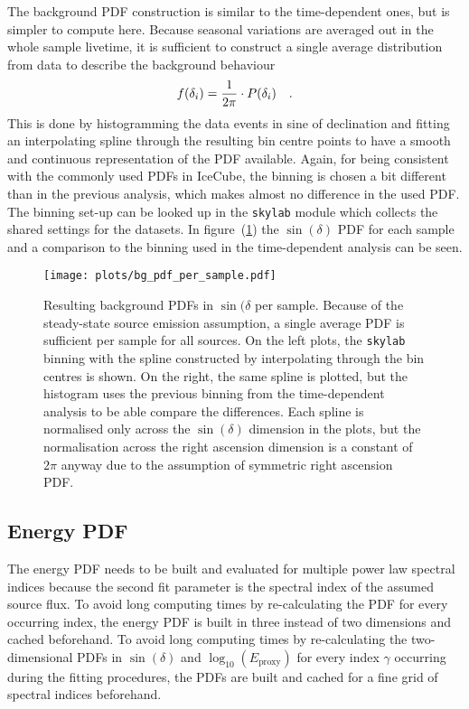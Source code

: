 The background PDF construction is similar to the time-dependent ones, but is simpler to compute here.
Because seasonal variations are averaged out in the whole sample livetime, it is sufficient to construct a single average distribution from data to describe the background behaviour
\begin{equation}
  f(\delta_i) = \frac{1}{2\pi}\cdot P(\delta_i)
  \quad\text{.}
\end{equation}
This is done by histogramming the data events in sine of declination and fitting an interpolating spline through the resulting bin centre points to have a smooth and continuous representation of the PDF available.
Again, for being consistent with the commonly used PDFs in IceCube, the binning is chosen a bit different than in the previous analysis, which makes almost no difference in the used PDF.
The binning set-up can be looked up in the \lstinline!skylab! module which collects the shared settings for the datasets.
In figure~(\ref{fig:tindep_bg_pdf_per_sample}) the $\sin(\delta)$ PDF for each sample and a comparison to the binning used in the time-dependent analysis can be seen.

\begin{figure}[htbp]
  \centering
  \texttt{[image: plots/bg\_pdf\_per\_sample.pdf]}
  \caption[Background PDFs per source per sample for the time-integrated analysis]{
    Resulting background PDFs in $\sin(\delta$ per sample.
    Because of the steady-state source emission assumption, a single average PDF is sufficient per sample for all sources.
    On the left plots, the \lstinline!skylab! binning with the spline constructed by interpolating through the bin centres is shown.
    On the right, the same spline is plotted, but the histogram uses the previous binning from the time-dependent analysis to be able compare the differences.
    Each spline is normalised only across the $\sin(\delta)$ dimension in the plots, but the normalisation across the right ascension dimension is a constant of $2\pi$ anyway due to the assumption of symmetric right ascension PDF.
  }
  \label{fig:tindep_bg_pdf_per_sample}
\end{figure}

\subsection*{Energy PDF}
The energy PDF needs to be built and evaluated for multiple power law spectral indices because the second fit parameter is the spectral index of the assumed source flux.
To avoid long computing times by re-calculating the PDF for every occurring index, the energy PDF is built in three instead of two dimensions and cached beforehand.
To avoid long computing times by re-calculating the two-dimensional PDFs in $\sin(\delta)$ and $\log_{10}\left(E_\text{proxy}\right)$ for every index $\gamma$ occurring during the fitting procedures, the PDFs are built and cached for a fine grid of spectral indices beforehand.

